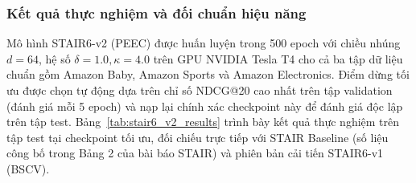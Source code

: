 \subsubsection{Kết quả thực nghiệm và đối chuẩn hiệu năng}

Mô hình STAIR6-v2 (PEEC) được huấn luyện trong 500 epoch với chiều nhúng $d = 64$, hệ số $\delta = 1.0, \kappa = 4.0$ trên GPU NVIDIA Tesla T4 cho cả ba tập dữ liệu chuẩn gồm Amazon Baby, Amazon Sports và Amazon Electronics. Điểm dừng tối ưu được chọn tự động dựa trên chỉ số NDCG@20 cao nhất trên tập validation (đánh giá mỗi 5 epoch) và nạp lại chính xác checkpoint này để đánh giá độc lập trên tập test. Bảng~\ref{tab:stair6_v2_results} trình bày kết quả thực nghiệm trên tập test tại checkpoint tối ưu, đối chiếu trực tiếp với STAIR Baseline (số liệu công bố trong Bảng 2 của bài báo STAIR) và phiên bản cải tiến STAIR6-v1 (BSCV).

